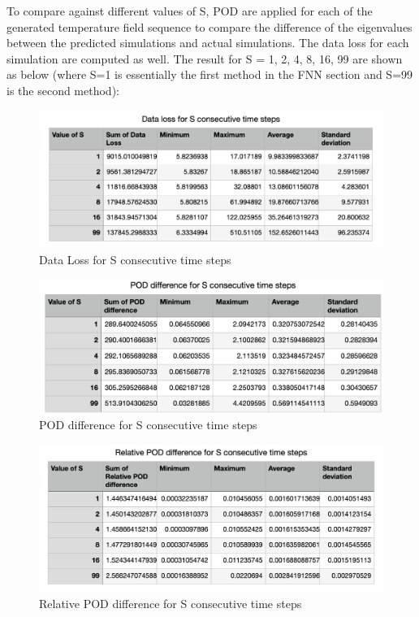 To compare against different values of S, POD are applied for each of the generated temperature field sequence to compare the difference of the eigenvalues between the predicted simulations and actual simulations. The data loss for each simulation are computed as well. The result for S = 1, 2, 4, 8, 16, 99 are shown as below (where S=1 is essentially the first method in the FNN section and S=99 is the second method):

\begin{figure}[H]
    \caption{Data Loss for S consecutive time steps}
    \includegraphics[scale=0.6]{Report LaTeX/figures/mantle_convection_images/further_testings/Data_Loss_table.png}
\end{figure}

\begin{figure}[H]
    \caption{POD difference for S consecutive time steps}
    \includegraphics[scale=0.6]{Report LaTeX/figures/mantle_convection_images/further_testings/POD_table.png}
\end{figure}

\begin{figure}[H]
    \caption{Relative POD difference for S consecutive time steps}
    \includegraphics[scale=0.6]{Report LaTeX/figures/mantle_convection_images/further_testings/Relative_POD_table.png}
\end{figure}

